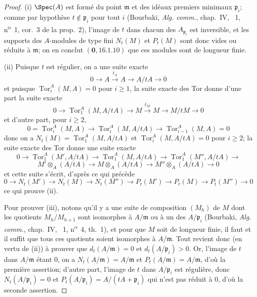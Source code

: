 \begin{proof}
(i) $\Spec(A)$ est formé du point $\mathfrak{m}$ et des idéaux premiers minimaux $\mathfrak{p}_i$;
comme par hypothèse $t\notin\mathfrak{p}_i$ pour tout $i$ (Bourbaki, \emph{Alg. comm.}, chap.~IV, \textsection~1, n\textsuperscript{o}~1, cor.~3 de la prop.~2), l'image de $t$ dans chacun des $A_{\mathfrak{p}_i}$ est inversible, et les supports des $A$-modules de type fini $N_t(M)$ et $P_t(M)$ sont donc vides ou réduits à $\mathfrak{m}$;
on en conclut $(\mathbf{0},16.1.10)$ que ces modules sont de longueur finie.

(ii) Puisque $t$ est régulier, on a une suite exacte
\[
  0\to A\xrightarrow{t_A}A\to A/tA\to0
\]
et puisque $\operatorname{Tor}_i^A(M,A)=0$ pour $i\geq1$, la suite exacte des Tor donne d'une part la suite exacte
\[
  0\to\operatorname{Tor}_1^A(M,A/tA)\to M\xrightarrow{t_M}M\to M/tM\to0
\]
et d'autre part, pour $i\geq2$,
\[
  0=\operatorname{Tor}_i^A(M,A)\to\operatorname{Tor}_i^A(M,A/tA)\to\operatorname{Tor}_{i-1}^A(M,A)=0
\]
donc on a $N_t(M)=\operatorname{Tor}_1^A(M,A/tA)$ et $\operatorname{Tor}_i^A(M,A/tA)=0$ pour $i\geq2$;
la suite exacte des Tor donne une suite exacte
\[
  0\to\operatorname{Tor}_1^A(M',A/tA)\to\operatorname{Tor}_1^A(M,A/tA)\to\operatorname{Tor}_1^A(M'',A/tA)\to
\]
\[
  M'\otimes_A(A/tA)\to M\otimes_A(A/tA)\to M''\otimes_A(A/tA)\to0
\]
et cette suite s'écrit, d'après ce qui précède
\[
  0\to N_t(M')\to N_t(M)\to N_t(M'')\to P_t(M')\to P_t(M)\to P_t(M'')\to0
\]
ce qui prouve (ii).

Pour prouver (iii), notons qu'il y a une suite de composition $(M_h)$ de $M$ dont les quotients $M_h/M_{h+1}$ sont isomorphes à $A/\mathfrak{m}$ ou à un des $A/\mathfrak{p}_i$ (Bourbaki, \emph{Alg. comm.}, chap.~IV, \textsection~1, n\textsuperscript{o}~4, th.~1), et pour que $M$ soit de longueur finie, il faut et il suffit que tous ces quotients soient isomorphes à $A/\mathfrak{m}$.
Tout revient donc (en vertu de (ii)) à prouver que $d_t(A/\mathfrak{m})=0$ et $d_t(A/\mathfrak{p}_i)>0$.
Or, l'image de $t$ dans $A/\mathfrak{m}$ étant $0$, on a $N_t(A/\mathfrak{m})=A/\mathfrak{m}$ et $P_t(A/\mathfrak{m})=A/\mathfrak{m}$, d'où la première assertion;
d'autre part, l'image de $t$ dans $A/\mathfrak{p}_i$ est régulière, donc $N_t(A/\mathfrak{p}_i)=0$ et $P_t(A/\mathfrak{p}_i)=A/(tA+\mathfrak{p}_i)$ qui n'est pas réduit à $0$, d'où la seconde assertion.


\end{proof}
